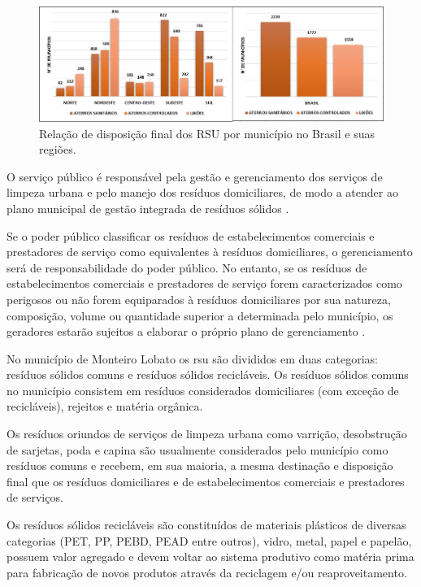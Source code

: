\begin{figure}
	\centering
	\includegraphics[width=0.75\linewidth]{produtos/prodtres/image005}
	\caption{Relação de disposição final dos RSU por município no Brasil e suas regiões.}
	\label{fig:image005}
\end{figure}

	O serviço público é responsável pela gestão e gerenciamento dos serviços de limpeza urbana e pelo manejo dos resíduos domiciliares, de modo a atender ao plano municipal de gestão integrada de resíduos sólidos \cite{brasil:12305}.
	
	Se o poder público classificar os resíduos de estabelecimentos comerciais e prestadores de serviço como equivalentes à resíduos domiciliares, o gerenciamento será de responsabilidade do poder público. No entanto, se os resíduos de estabelecimentos comerciais e prestadores de serviço forem caracterizados como perigosos ou não forem equiparados à resíduos domiciliares por sua natureza, composição, volume ou quantidade superior a determinada pelo município, os geradores estarão sujeitos a elaborar o próprio plano de gerenciamento \cite{brasil:12305}.
	
	No município de Monteiro Lobato os \gls{rsu} são divididos em duas categorias: resíduos sólidos comuns e resíduos sólidos recicláveis. Os resíduos sólidos comuns no município consistem em resíduos considerados domiciliares (com exceção de recicláveis), rejeitos e matéria orgânica. 
	
	Os resíduos oriundos de serviços de limpeza urbana como varrição, desobstrução de sarjetas, poda e capina são usualmente considerados pelo município como resíduos comuns e recebem, em sua maioria, a mesma destinação e disposição final que os resíduos domiciliares e de estabelecimentos comerciais e prestadores de serviços.
	
	Os resíduos sólidos recicláveis são constituídos de materiais plásticos de diversas categorias (PET, PP, PEBD, PEAD entre outros), vidro, metal, papel e papelão, possuem valor agregado e devem voltar ao sistema produtivo como matéria prima para fabricação de novos produtos através da reciclagem e/ou reaproveitamento.
	
